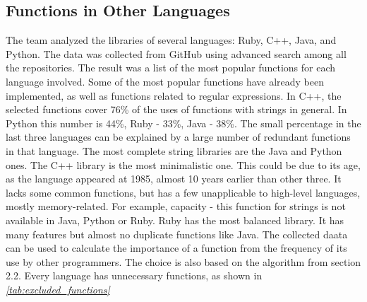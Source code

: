 \documentclass[11pt,nonacm,natbib=false]{acmart}
\begin{document}
\subsection{Functions in Other Languages}
The team analyzed the libraries of several languages: Ruby, C++, Java, and Python. 
The data was collected from GitHub using advanced search among all the repositories. 
The result was a list of the most popular functions for each language involved. 
Some of the most popular functions have already been implemented, as well as functions related to regular expressions. 
In C++, the selected functions cover 76\% of the uses of functions with strings in general. 
In Python this number is 44\%, Ruby - 33\%, Java - 38\%. 
The small percentage in the last three languages can be explained by a large number of redundant functions in that language. 
The most complete string libraries are the Java and Python ones. The C++ library is the most minimalistic one. 
This could be due to its age, as the language appeared at 1985, almost 10 years earlier than other three. It lacks some common functions, but has a few unapplicable to high-level languages, mostly memory-related. 
For example, capacity - this function for strings is not available in Java, Python or Ruby. 
Ruby has the most balanced library. 
It has many features but almost no duplicate functions like Java.
The collected daata can be used to calculate the importance of a function from the frequency of its use by other programmers. The choice is also based on the algorithm from section 2.2. Every language has unnecessary functions, as shown in \emph{\autoref{tab:excluded_functions}}
\end{document}
